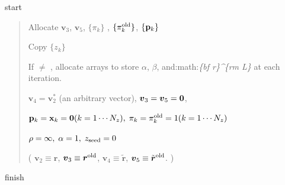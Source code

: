 \documentclass[letterpaper,10pt,dvipdfmx,openany]{sphinxmanual}
\begin{document}
 start
\begin{quote}

Allocate \({\boldsymbol v}_3\), \({\boldsymbol v}_5\),
\(\{\pi_k\}\) , \(\{\pi_k^{\rm old}\}\), \(\{{\bf p}_k\}\)

Copy \(\{z_k\}\)

If  \(\neq\)  ,
allocate arrays to store \(\alpha\), \(\beta\),
and:math:\emph{\{bf r\}\textasciicircum{}\{rm L\}} at each iteration.

\({\boldsymbol v}_4 = {\boldsymbol v}_2^*\) (an arbitrary vector),
\({\boldsymbol v}_3 = {\boldsymbol v}_5 = {\bf 0}\),

\({\bf p}_{k} = {\bf x}_k = {\bf 0}(k=1 \cdots N_z),\; \pi_k=\pi_k^{\rm old} = 1(k=1 \cdots N_z)\)

\(\rho = \infty,\; \alpha = 1,\; z_{\rm seed}=0\)

( \({\boldsymbol v}_2 \equiv {\boldsymbol r}\),
\({\boldsymbol v}_3 \equiv {\boldsymbol r}^{\rm old}\),
\({\boldsymbol v}_4 \equiv {\tilde {\boldsymbol r}}\),
\({\boldsymbol v}_5 \equiv {\tilde {\boldsymbol r}}^{\rm old}\). )
\end{quote}

 finish
\end{document}
